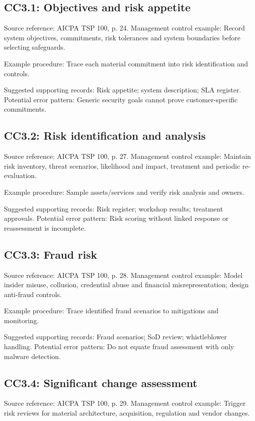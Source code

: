 \documentclass[10pt,oneside]{report}
\begin{document}
\subsection*{CC3.1: Objectives and risk appetite}
Source reference: AICPA TSP 100, p. 24. Management control example: Record system objectives, commitments, risk tolerances and system boundaries before selecting safeguards.

Example procedure: Trace each material commitment into risk identification and controls.

Suggested supporting records: Risk appetite; system description; SLA register. Potential error pattern: Generic security goals cannot prove customer-specific commitments.

\subsection*{CC3.2: Risk identification and analysis}
Source reference: AICPA TSP 100, p. 27. Management control example: Maintain risk inventory, threat scenarios, likelihood and impact, treatment and periodic re-evaluation.

Example procedure: Sample assets/services and verify risk analysis and owners.

Suggested supporting records: Risk register; workshop results; treatment approvals. Potential error pattern: Risk scoring without linked response or reassessment is incomplete.

\subsection*{CC3.3: Fraud risk}
Source reference: AICPA TSP 100, p. 28. Management control example: Model insider misuse, collusion, credential abuse and financial misrepresentation; design anti-fraud controls.

Example procedure: Trace identified fraud scenarios to mitigations and monitoring.

Suggested supporting records: Fraud scenarios; SoD review; whistleblower handling. Potential error pattern: Do not equate fraud assessment with only malware detection.

\subsection*{CC3.4: Significant change assessment}
Source reference: AICPA TSP 100, p. 29. Management control example: Trigger risk reviews for material architecture, acquisition, regulation and vendor changes.
\end{document}

